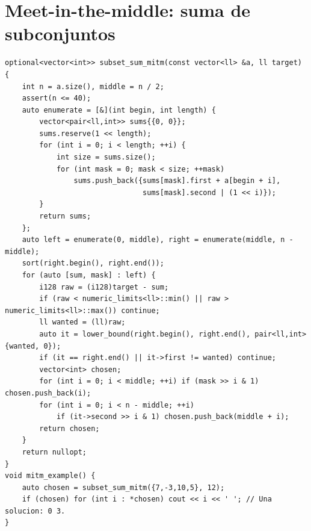 \section{Meet-in-the-middle: suma de subconjuntos}

\begin{lstlisting}[style=cpp]
optional<vector<int>> subset_sum_mitm(const vector<ll> &a, ll target) {
    int n = a.size(), middle = n / 2;
    assert(n <= 40);
    auto enumerate = [&](int begin, int length) {
        vector<pair<ll,int>> sums{{0, 0}};
        sums.reserve(1 << length);
        for (int i = 0; i < length; ++i) {
            int size = sums.size();
            for (int mask = 0; mask < size; ++mask)
                sums.push_back({sums[mask].first + a[begin + i],
                                sums[mask].second | (1 << i)});
        }
        return sums;
    };
    auto left = enumerate(0, middle), right = enumerate(middle, n - middle);
    sort(right.begin(), right.end());
    for (auto [sum, mask] : left) {
        i128 raw = (i128)target - sum;
        if (raw < numeric_limits<ll>::min() || raw > numeric_limits<ll>::max()) continue;
        ll wanted = (ll)raw;
        auto it = lower_bound(right.begin(), right.end(), pair<ll,int>{wanted, 0});
        if (it == right.end() || it->first != wanted) continue;
        vector<int> chosen;
        for (int i = 0; i < middle; ++i) if (mask >> i & 1) chosen.push_back(i);
        for (int i = 0; i < n - middle; ++i)
            if (it->second >> i & 1) chosen.push_back(middle + i);
        return chosen;
    }
    return nullopt;
}
void mitm_example() {
    auto chosen = subset_sum_mitm({7,-3,10,5}, 12);
    if (chosen) for (int i : *chosen) cout << i << ' '; // Una solucion: 0 3.
}
\end{lstlisting}

